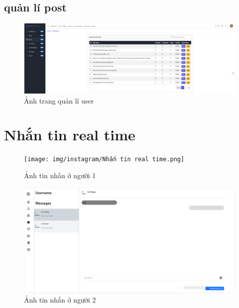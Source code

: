 \subsection{quản lí post}
\begin{figure}[H]
    \centering
    \includegraphics[width=1\textwidth]{img/instagram/trang_quan_li_post.png}
    \caption{Ảnh trang quản lí user}
\end{figure}

\FloatBarrier %

\section{Nhắn tin real time}
\begin{figure}[H]
    \centering
    \texttt{[image: img/instagram/Nhắn tin real time.png]}
    \caption{Ảnh tin nhắn ở người 1}
\end{figure}

\FloatBarrier %

\begin{figure}[H]
    \centering
    \includegraphics[width=1\textwidth]{img/instagram/nhan_tin_real_time_2.png}
    \caption{Ảnh tin nhắn ở người 2}
\end{figure}

\FloatBarrier %

